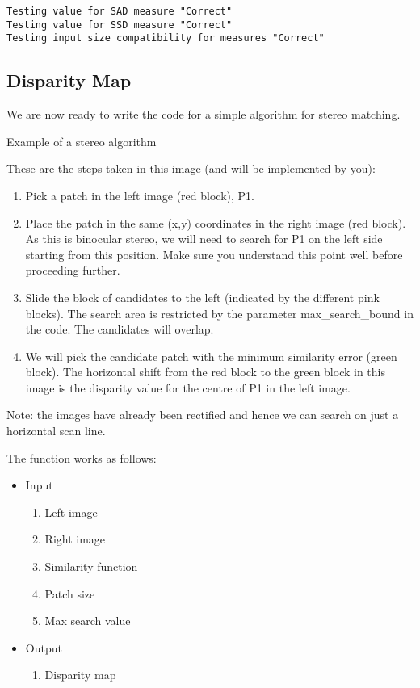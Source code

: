 \documentclass[
  letterpaper,
  DIV=11,
  numbers=noendperiod]{scrartcl}
\providecommand{\tightlist}{%
  \setlength{\itemsep}{0pt}\setlength{\parskip}{0pt}}\usepackage{longtable,booktabs,array}
\begin{document}
\begin{verbatim}
Testing value for SAD measure "Correct"
Testing value for SSD measure "Correct"
Testing input size compatibility for measures "Correct"
\end{verbatim}

\hypertarget{disparity-map}{%
\subsection{Disparity Map}\label{disparity-map}}

We are now ready to write the code for a simple algorithm for stereo
matching.

Example of a stereo algorithm

These are the steps taken in this image (and will be implemented by
you):

\begin{enumerate}
\def\labelenumi{\arabic{enumi}.}
\tightlist
\item
  Pick a patch in the left image (red block), P1.
\item
  Place the patch in the same (x,y) coordinates in the right image (red
  block). As this is binocular stereo, we will need to search for P1 on
  the left side starting from this position. Make sure you understand
  this point well before proceeding further.
\item
  Slide the block of candidates to the left (indicated by the different
  pink blocks). The search area is restricted by the parameter
  max\_search\_bound in the code. The candidates will overlap.
\item
  We will pick the candidate patch with the minimum similarity error
  (green block). The horizontal shift from the red block to the green
  block in this image is the disparity value for the centre of P1 in the
  left image.
\end{enumerate}

Note: the images have already been rectified and hence we can search on
just a horizontal scan line.

The function works as follows:

\begin{itemize}
\tightlist
\item
  Input

  \begin{enumerate}
  \def\labelenumi{\arabic{enumi}.}
  \tightlist
  \item
    Left image
  \item
    Right image
  \item
    Similarity function
  \item
    Patch size
  \item
    Max search value
  \end{enumerate}
\item
  Output

  \begin{enumerate}
  \def\labelenumi{\arabic{enumi}.}
  \tightlist
  \item
    Disparity map
  \end{enumerate}
\end{itemize}
\end{document}

